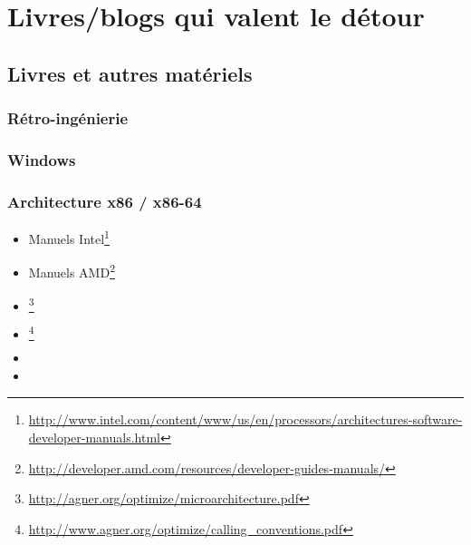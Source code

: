 \chapter{Livres/blogs qui valent le détour}

\section{Livres et autres matériels}

\subsection{Rétro-ingénierie}



\subsection{Windows}



\subsection{\CCpp}



\subsection{Architecture x86 / x86-64}

\label{x86_manuals}
\begin{itemize}
\item Manuels Intel\footnote{\AlsoAvailableAs \url{http://www.intel.com/content/www/us/en/processors/architectures-software-developer-manuals.html}}

\item Manuels AMD\footnote{\AlsoAvailableAs \url{http://developer.amd.com/resources/developer-guides-manuals/}}

\item \AgnerFog{}\footnote{\AlsoAvailableAs \url{http://agner.org/optimize/microarchitecture.pdf}}

\item \AgnerFogCC{}\footnote{\AlsoAvailableAs \url{http://www.agner.org/optimize/calling_conventions.pdf}}

\item \IntelOptimization

\item \AMDOptimization
\end{itemize}

